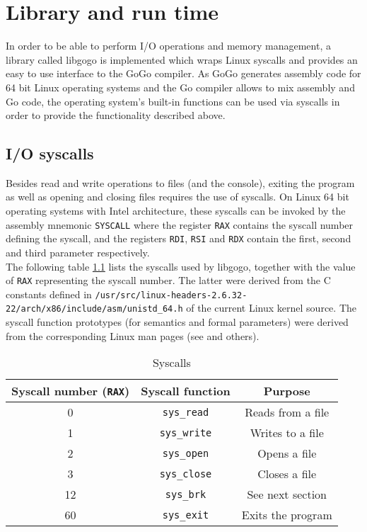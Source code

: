 \documentclass[a4paper]{scrreprt}
\begin{document}
  \chapter{Library and run time}
    In order to be able to perform I/O operations and memory management, a library called libgogo is implemented which wraps Linux syscalls and provides an easy to use interface to the GoGo compiler. As GoGo generates assembly code for 64 bit Linux operating systems and the Go compiler allows to mix assembly and Go code, the operating system's built-in functions can be used via syscalls in order to provide the functionality described above.

    \section{I/O syscalls}
      Besides read and write operations to files (and the console), exiting the program as well as opening and closing files requires the use of syscalls. On Linux 64 bit operating systems with Intel architecture, these syscalls can be invoked by the assembly mnemonic \texttt{SYSCALL} where the register \texttt{RAX} contains the syscall number defining the syscall, and the registers \texttt{RDI}, \texttt{RSI} and \texttt{RDX} contain the first, second and third parameter respectively\cite{var08}.\\
      The following table \ref{tbl:syscalls} lists the syscalls used by libgogo, together with the value of \texttt{RAX} representing the syscall number. The latter were derived from the C constants defined in \texttt{/usr/src/linux-headers-2.6.32-22/arch/x86/include/asm/unistd\_64.h} of the current Linux kernel source\cite{var10}. The syscall function prototypes (for semantics and formal parameters) were derived from the corresponding Linux man pages (see \cite{var97} and others).

      \begin{table}[htb]
      \centering
      \begin{tabular}{ccc}
        \toprule
        \textbf{Syscall number (\texttt{RAX})} & \textbf{Syscall function} & \textbf{Purpose}\\
        \midrule
        0 & \texttt{sys\_read} & Reads from a file\\
        1 & \texttt{sys\_write} & Writes to a file\\
        2 & \texttt{sys\_open} & Opens a file\\
        3 & \texttt{sys\_close} & Closes a file\\
        12 & \texttt{sys\_brk} & See next section\\
        60 & \texttt{sys\_exit} & Exits the program\\
        \bottomrule
      \end{tabular}
      \caption{Syscalls}
      \label{tbl:syscalls}
      \end{table}
\end{document}
